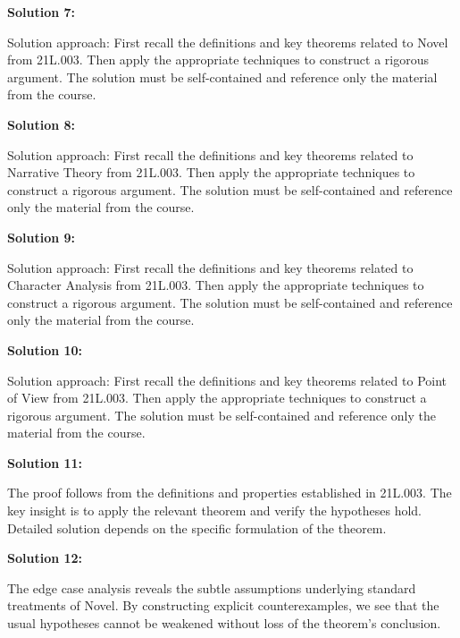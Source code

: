 \documentclass[12pt,a4paper]{exam}
\begin{document}
\vspace{0.5cm}

\textbf{Solution 7:}

Solution approach: First recall the definitions and key theorems related to Novel from 21L.003. Then apply the appropriate techniques to construct a rigorous argument. The solution must be self-contained and reference only the material from the course.

\vspace{0.5cm}

\textbf{Solution 8:}

Solution approach: First recall the definitions and key theorems related to Narrative Theory from 21L.003. Then apply the appropriate techniques to construct a rigorous argument. The solution must be self-contained and reference only the material from the course.

\vspace{0.5cm}

\textbf{Solution 9:}

Solution approach: First recall the definitions and key theorems related to Character Analysis from 21L.003. Then apply the appropriate techniques to construct a rigorous argument. The solution must be self-contained and reference only the material from the course.

\vspace{0.5cm}

\textbf{Solution 10:}

Solution approach: First recall the definitions and key theorems related to Point of View from 21L.003. Then apply the appropriate techniques to construct a rigorous argument. The solution must be self-contained and reference only the material from the course.

\vspace{0.5cm}

\textbf{Solution 11:}

The proof follows from the definitions and properties established in 21L.003. The key insight is to apply the relevant theorem and verify the hypotheses hold. Detailed solution depends on the specific formulation of the theorem.

\vspace{0.5cm}

\textbf{Solution 12:}

The edge case analysis reveals the subtle assumptions underlying standard treatments of Novel. By constructing explicit counterexamples, we see that the usual hypotheses cannot be weakened without loss of the theorem's conclusion.
\end{document}
